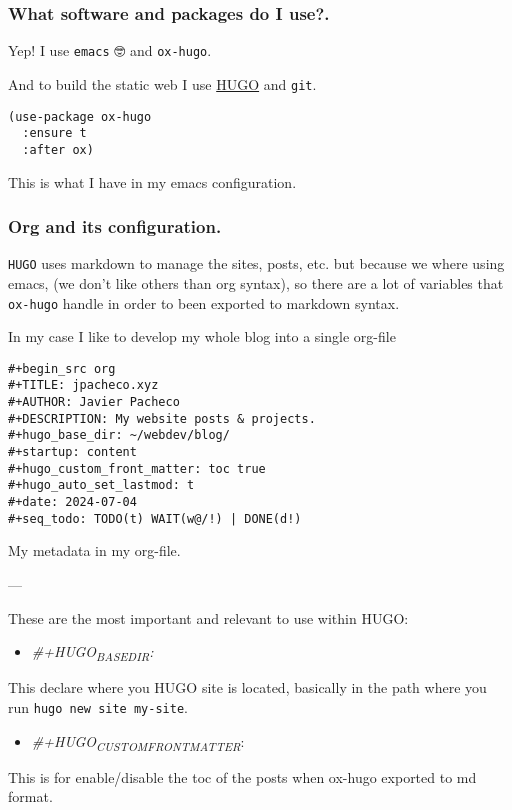 \documentclass[11pt]{article}
\begin{document}
\subsubsection{What software and packages do I use?.}
\label{sec:orgd149edd}
Yep! I use \texttt{emacs} 🤓 and \texttt{ox-hugo}.

And to build the static web I use \href{https://gohugo.io/getting-started/quick-start/}{HUGO} and \texttt{git}.
\begin{listing}[htbp]
\begin{verbatim}
(use-package ox-hugo
  :ensure t
  :after ox)
\end{verbatim}
\caption{This is what I have in my emacs configuration.}
\end{listing}
\subsubsection{Org and its configuration.}
\label{sec:org3eb15b2}
\texttt{HUGO} uses markdown to manage the sites, posts, etc. but because we where using emacs, (we don't like others than org syntax), so there are a lot of variables that \texttt{ox-hugo} handle in order to been exported to markdown syntax.

In my case I like to develop my whole blog into a single org-file

\begin{listing}[htbp]
\begin{verbatim}
#+begin_src org
#+TITLE: jpacheco.xyz
#+AUTHOR: Javier Pacheco
#+DESCRIPTION: My website posts & projects.
#+hugo_base_dir: ~/webdev/blog/
#+startup: content
#+hugo_custom_front_matter: toc true
#+hugo_auto_set_lastmod: t
#+date: 2024-07-04
#+seq_todo: TODO(t) WAIT(w@/!) | DONE(d!)
\end{verbatim}
\caption{My metadata in my org-file.}
\end{listing}
---

These are the most important and relevant to use within HUGO:

\begin{itemize}
\item \emph{\#+HUGO\textsubscript{BASE}\textsubscript{DIR}:}
\end{itemize}
This declare where you HUGO site is located, basically in the path where you run \texttt{hugo new site my-site}.
\begin{itemize}
\item \emph{\#+HUGO\textsubscript{CUSTOM}\textsubscript{FRONT}\textsubscript{MATTER}}:
\end{itemize}
This is for enable/disable the toc of the posts when ox-hugo exported to md format.
\end{document}

